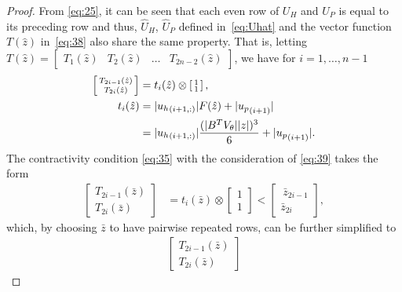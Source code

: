 \documentclass[letter, 10pt, conference]{ieeeconf}
\newcommand{\1}{\mathbf{1}}
\newcommand{\0}{\mathbf{0}}
\begin{document}
{\begin{proof}
From \eqref{eq:25}, it can be seen that each even
row of $U_H$ and $U_P$ is equal to its preceding row and thus, $\hat
U_H$, $\hat U_P$ defined in~\eqref{eq:Uhat} and the vector function
$T(\hat{z})$ in~\eqref{eq:38} also share the same property. That is,
letting $T(\hat{z})=
\left[\begin{smallmatrix}
  T_1(\hat{z}) & T_2 (\hat{z}) & \dots & T_{2n-2}(\hat{z}) 
\end{smallmatrix}\right] $, 
we have for $i=1,\dots,n-1$
  \begin{align}
  	\label{eq:39}
    \left[\begin{smallmatrix}
      	T_{2i-1}(\hat{z}) \\ T_{2i}(\hat{z}) 
    \end{smallmatrix}\right]
    &= t_i(\hat{z}) \otimes 
    \left[\begin{smallmatrix} 1 \\ 1 \end{smallmatrix}\right], 
    \\
    \notag
    t_i(\hat{z}) &= |{u_h}_{(i+1,:)}| F(\hat{z}) + |{u_p}_{(i+1)}|
    \\
    \label{eq:391}
    &= |{u_h}_{(i+1,:)}| \frac{(|B^T V_\theta||z|)^3}{6} +
    |{u_p}_{(i+1)}|.
  \end{align}
  The contractivity condition \eqref{eq:35} with the consideration of 
  \eqref{eq:39} takes the form
  \begin{align*}
  	\left[\begin{smallmatrix}
		T_{2i-1}(\bar{z}) \\ T_{2i}(\bar{z}) 
	\end{smallmatrix}\right]
	&= t_i(\bar{z}) \otimes 
	\left[\begin{smallmatrix} 1 \\ 1 \end{smallmatrix}\right]
	<
	\left[\begin{smallmatrix} \
		\bar{z}_{2i-1} \\ \bar{z}_{2i} 
	\end{smallmatrix}\right],
  \end{align*}
  which, by choosing $\bar{z}$ to have pairwise repeated rows, can be
  further simplified to
  \begin{align*}
  	\left[\begin{smallmatrix}
		T_{2i-1}(\bar{z}) \\ T_{2i}(\bar{z}) 
	\end{smallmatrix}\right]

\end{align*}
\end{proof}}
\end{document}
